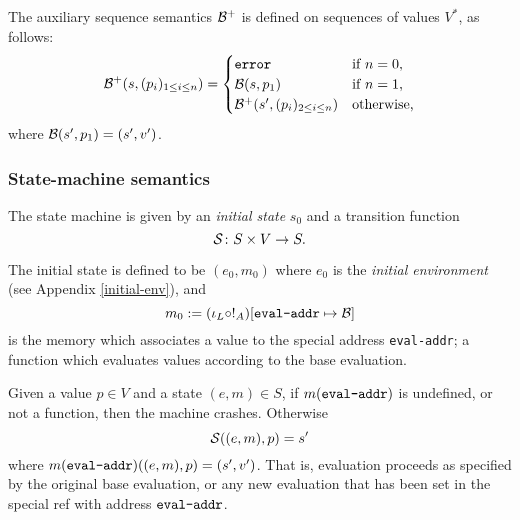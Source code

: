 The auxiliary sequence semantics $\B^+$ is defined on sequences of values $V^*$, as follows:
  \[
    \B^+(s, (p_i)_{1 \leq i \leq n}) =
    \begin{cases}
      \mathtt{error} & \text{if $n = 0$,}\\
      \B(s, p_1) & \text{if $n = 1$,}\\
      \B^+(s', (p_i)_{2 \leq i \leq n}) & \text{otherwise,}
    \end{cases}
  \]
  where $\B(s', p_1) = (s', v')$.

\subsubsection{State-machine semantics}
The \rad{} state machine is given by an \emph{initial state} $s_0$ and a
transition function
\[
  \S \colon S \times V \to S.
\]

The initial state is defined to be $(e_0,m_0)$ where $e_0$ is the \emph{initial
  environment} (see Appendix \ref{initial-env}), and
\[
  m_0 := (\iota_L \circ !_A)[\text{\texttt{eval-addr}} \mapsto \B]
\]
is the memory which associates a value to the special address
\texttt{eval-addr}; a function which evaluates values according to the base
evaluation.

Given a value $p \in V$ and a state $(e,m) \in S$, if
$m(\text{\texttt{eval-addr}})$ is undefined, or not a function, then the machine
crashes. Otherwise
\[
  \S((e,m), p) = s'
\]
where $m(\text{\texttt{eval-addr}})((e,m), p) = (s', v')$.
That is, evaluation proceeds as specified by the original base evaluation, or
any new evaluation that has been set in the special ref with address $\evalAddr$.
